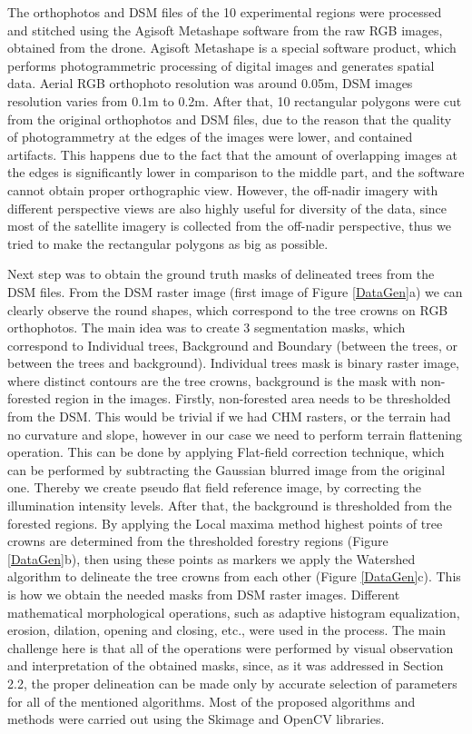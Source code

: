 The orthophotos and \gls{DSM} files of the 10 experimental regions were processed and stitched using the Agisoft Metashape software from the raw RGB images, obtained from the drone. Agisoft Metashape is a special software product, which performs photogrammetric processing of digital images and generates spatial data. Aerial RGB orthophoto resolution was around 0.05m, \gls{DSM} images resolution varies from 0.1m to 0.2m. After that, 10 rectangular polygons were cut from the original orthophotos and \gls{DSM} files, due to the reason that the quality of photogrammetry at the edges of the images were lower, and contained artifacts. This happens due to the fact that the amount of overlapping images at the edges is significantly lower in comparison to the middle part, and the software cannot obtain proper orthographic view. However, the off-nadir imagery with different perspective views are also highly useful for diversity of the data, since most of the satellite imagery is collected from the off-nadir perspective, thus we tried to make the rectangular polygons as big as possible. 

Next step was to obtain the ground truth masks of delineated trees from the \gls{DSM} files. From the \gls{DSM} raster image (first image of Figure \ref{DataGen}a) we can clearly observe the round shapes, which correspond to the tree crowns on RGB orthophotos. The main idea was to create 3 segmentation masks, which correspond to Individual trees, Background and Boundary (between the trees, or between the trees and background). Individual trees mask is binary raster image, where distinct contours are the tree crowns, background is the mask with non-forested region in the images. Firstly, non-forested area needs to be thresholded from the \gls{DSM}. This would be trivial if we had \gls{CHM} rasters, or the terrain had no curvature and slope, however in our case we need to perform terrain flattening operation. This can be done by applying Flat-field correction technique, which can be performed by subtracting the Gaussian blurred image from the original one. Thereby we create pseudo flat field reference image, by correcting the illumination intensity levels. After that, the background is thresholded from the forested regions. By applying the Local maxima method highest points of tree crowns are determined from the thresholded forestry regions (Figure \ref{DataGen}b), then using these points as markers we apply the Watershed algorithm to delineate the tree crowns from each other (Figure \ref{DataGen}c). This is how we obtain the needed masks from \gls{DSM} raster images. Different mathematical morphological operations, such as adaptive histogram equalization, erosion, dilation, opening and closing, etc., were used in the process. The main challenge here is that all of the operations were performed by visual observation and interpretation of the obtained masks, since, as it was addressed in Section 2.2, the proper delineation can be made only by accurate selection of parameters for all of the mentioned algorithms. Most of the proposed algorithms and methods were carried out using the Skimage and OpenCV libraries.

